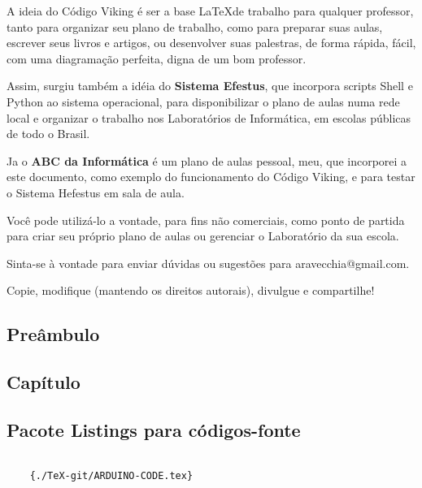 \large
\begin{multicols}{2}
	A ideia do Código Viking é ser a base \LaTeX \space de trabalho para qualquer professor, tanto para organizar seu plano de trabalho, como para preparar suas aulas, escrever seus livros e artigos, ou desenvolver suas palestras, de forma rápida, fácil, com uma diagramação perfeita, digna de um bom professor.

Assim, surgiu também a idéia do \textbf{Sistema Efestus}, que incorpora scripts Shell e Python ao sistema operacional, para disponibilizar o plano de aulas numa rede local e organizar o trabalho nos Laboratórios de Informática, em escolas públicas de todo o Brasil.

Ja o \textbf{ABC da Informática} é um plano de aulas pessoal, meu, que incorporei a este documento, como exemplo do funcionamento do Código Viking, e para testar o Sistema Hefestus em sala de aula.

Você pode utilizá-lo a vontade, para fins não comerciais, como ponto de partida para criar seu próprio plano de aulas ou gerenciar o Laboratório da sua escola.

Sinta-se à vontade para enviar dúvidas ou sugestões para aravecchia@gmail.com.

Copie, modifique (mantendo os direitos autorais), divulgue e compartilhe!

\vfill\null
\columnbreak

\subsection[Preâmbulo]{Preâmbulo}



\vfill
\columnbreak

\subsection[Capítulo]{Capítulo}



\subsection[Pacote Listings para códigos-fonte]{Pacote Listings para códigos-fonte}

\begin{verbatim}
	
	{./TeX-git/ARDUINO-CODE.tex}


\end{verbatim}
\end{multicols}
